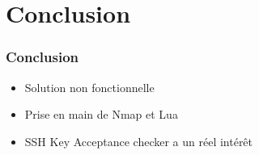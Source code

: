 \documentclass{beamer}
\begin{document}
\let\origaddtocontents=\addtocontents
\def\dontaddtocontents#1#2{}
\let\addtocontents=\dontaddtocontents
\section*{Conclusion}
\let\addtocontents=\origaddtocontents

\begin{frame}
  \frametitle{Conclusion}
  \begin{itemize}
  \item Solution non fonctionnelle
  \item Prise en main de Nmap et Lua
  \item \textsf{SSH Key Acceptance checker} a un réel intérêt
  \end{itemize}
\end{frame}
\end{document}
